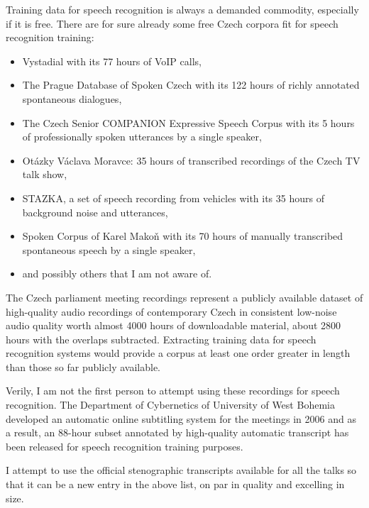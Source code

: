 \documentclass[runningheads,a4paper]{llncs}
\begin{document}
Training data for speech recognition is always a demanded commodity, especially
if it is free. There are for sure already some free Czech corpora fit for speech
recognition training:
\begin{itemize}
\item{
    Vystadial\cite{vystadialarticle} with its 77 hours of VoIP
    calls\cite{vystadialdata}, 
}
\item{
    The Prague Database of Spoken Czech\cite{pdtscarticle} with its 122 hours
    of richly annotated spontaneous dialogues\cite{pdtscdata},
}
\item{
    The Czech Senior COMPANION Expressive Speech Corpus with its 5 hours
    of professionally spoken utterances by a single speaker\cite{companiondata},
}
\item{
    Otázky Václava Moravce: 35 hours of transcribed recordings of the
    Czech TV talk show\cite{ovmdata},
}
\item{
    STAZKA, a set of speech recording from vehicles with its 35 hours of
    background noise and utterances\cite{stazkadata},
}
\item{
    Spoken Corpus of Karel Makoň\cite{kruuza2012making} with its 70 hours of
    manually transcribed spontaneous speech by a single speaker\cite{makondata},
}
\item{and possibly others that I am not aware of.}
\end{itemize}

The Czech parliament meeting recordings represent a publicly available dataset
of high-quality audio recordings of contemporary Czech in consistent low-noise
audio quality worth almost 4000 hours of downloadable material, about 2800 hours
with the overlaps subtracted. Extracting
training data for speech recognition systems would provide a corpus at least
one order greater in length than those so far publicly available.

Verily, I am not the first person to attempt using these recordings for speech
recognition. The Department of Cybernetics of University of West Bohemia
developed an automatic online subtitling system for the meetings in
2006\cite{pspsubs} and as a result, an 88-hour subset annotated by high-quality
automatic transcript has been released for speech recognition training
purposes\cite{pspdata}.

I attempt to use the official stenographic transcripts available for all the
talks so that it can be a new entry in the above list, on par in quality and
excelling in size.
\end{document}
